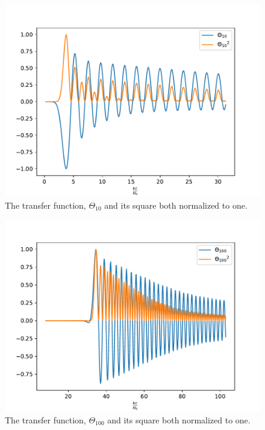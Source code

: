 \documentclass{aa}
\begin{document}
\begin{figure}[H]
   \includegraphics[scale=0.6]{../figures/milestone4/comparison1.pdf}
   \caption{The transfer function, $\Theta_{10}$ and its square both normalized to one.}\label{fig:m4_comparison1}
\end{figure}

\begin{figure}[H]
   \includegraphics[scale=0.6]{../figures/milestone4/comparison2.pdf}
   \caption{The transfer function, $\Theta_{100}$ and its square both normalized to one.}\label{fig:m4_comparison2}
\end{figure}
\end{document}
